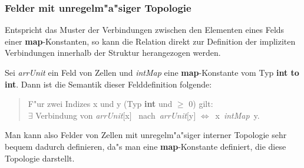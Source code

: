 \subsubsection{Felder mit unregelm"a"siger Topologie}
\label{mapstruct}

 
Entspricht das Muster der Verbindungen zwischen den
Elementen eines Felds einer {\bf map}-Konstanten, 
 so kann die
Relation direkt zur Definition
der impliziten Verbindungen innerhalb der Struktur herangezogen
werden.

Sei {\it arrUnit\/} ein Feld von Zellen und {\it intMap\/} eine {\bf map}-Konstante vom Typ {\bf int to int}. Dann
ist die Semantik dieser Felddefinition folgende: 
\begin{quote}
  F"ur zwei Indizes x und y  (Typ {\bf int} und $\geq$ 0) gilt: \\
  $\exists$ Verbindung von {\it arrUnit\/}$[$x$]$~ 
	nach~{\it arrUnit\/}$[$y$]$ $\Longleftrightarrow$~x~{\it intMap\/}~y.
\end{quote}

Man kann also Felder von Zellen mit unregelm"a"siger
interner Topologie sehr bequem dadurch definieren, da"s man eine {\bf
map}-Konstante definiert, die diese Topologie darstellt.

\begin{center}
\end{center}

